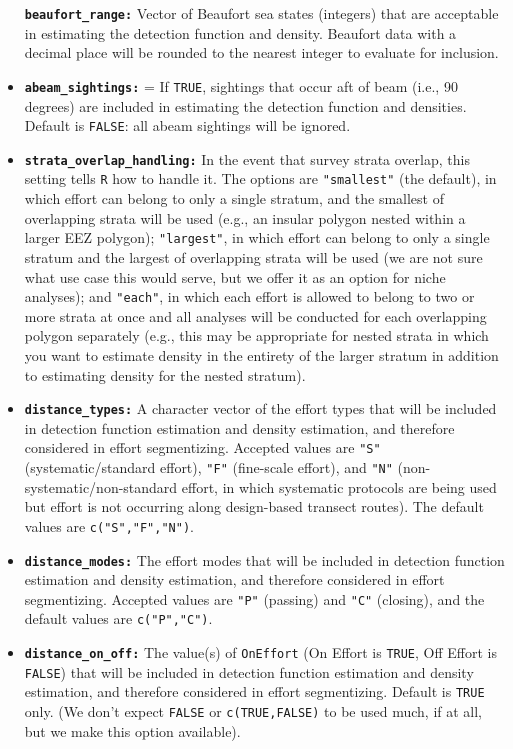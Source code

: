 \documentclass[
]{book}
\begin{document}
\begin{itemize}
  \textbf{\texttt{beaufort\_range:}} Vector of Beaufort sea states (integers) that are acceptable in estimating the detection function and density. Beaufort data with a decimal place will be rounded to the nearest integer to evaluate for inclusion.
\item
  \textbf{\texttt{abeam\_sightings:}} = If \texttt{TRUE}, sightings that occur aft of beam (i.e., 90 degrees) are included in estimating the detection function and densities. Default is \texttt{FALSE}: all abeam sightings will be ignored.
\item
  \textbf{\texttt{strata\_overlap\_handling:}} In the event that survey strata overlap, this setting tells \texttt{R} how to handle it. The options are \texttt{"smallest"} (the default), in which effort can belong to only a single stratum, and the smallest of overlapping strata will be used (e.g., an insular polygon nested within a larger EEZ polygon); \texttt{"largest"}, in which effort can belong to only a single stratum and the largest of overlapping strata will be used (we are not sure what use case this would serve, but we offer it as an option for niche analyses); and \texttt{"each"}, in which each effort is allowed to belong to two or more strata at once and all analyses will be conducted for each overlapping polygon separately (e.g., this may be appropriate for nested strata in which you want to estimate density in the entirety of the larger stratum in addition to estimating density for the nested stratum).
\item
  \textbf{\texttt{distance\_types:}} A character vector of the effort types that will be included in detection function estimation and density estimation, and therefore considered in effort segmentizing. Accepted values are \texttt{"S"} (systematic/standard effort), \texttt{"F"} (fine-scale effort), and \texttt{"N"} (non-systematic/non-standard effort, in which systematic protocols are being used but effort is not occurring along design-based transect routes). The default values are \texttt{c("S","F","N")}.
\item
  \textbf{\texttt{distance\_modes:}} The effort modes that will be included in detection function estimation and density estimation, and therefore considered in effort segmentizing. Accepted values are \texttt{"P"} (passing) and \texttt{"C"} (closing), and the default values are \texttt{c("P","C")}.
\item
  \textbf{\texttt{distance\_on\_off:}} The value(s) of \texttt{OnEffort} (On Effort is \texttt{TRUE}, Off Effort is \texttt{FALSE}) that will be included in detection function estimation and density estimation, and therefore considered in effort segmentizing. Default is \texttt{TRUE} only. (We don't expect \texttt{FALSE} or \texttt{c(TRUE,FALSE)} to be used much, if at all, but we make this option available).
\end{itemize}
\end{document}

